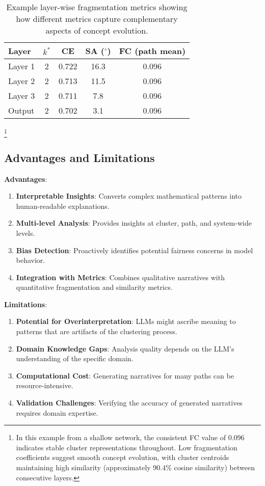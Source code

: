 \begin{table}[h!]
\centering
\caption{Example layer-wise fragmentation metrics showing how different metrics capture complementary aspects of concept evolution.}
\label{tab:fragmentation_metrics_example}
\begin{tabular}{lcccc}
\toprule
Layer & $k^*$ & CE & SA ($^\circ$) & FC (path mean) \\
\midrule
Layer 1 & 2 & 0.722 & 16.3 & 0.096 \\
Layer 2 & 2 & 0.713 & 11.5 & 0.096 \\
Layer 3 & 2 & 0.711 &  7.8 & 0.096 \\
Output  & 2 & 0.702 &  3.1 & 0.096 \\
\bottomrule
\end{tabular}
\end{table}\footnote{In this example from a shallow network, the consistent FC value of 0.096 indicates stable cluster representations throughout. Low fragmentation coefficients suggest smooth concept evolution, with cluster centroids maintaining high similarity (approximately 90.4\% cosine similarity) between consecutive layers.}

\subsection{Advantages and Limitations}

\textbf{Advantages}:
\begin{enumerate}
    \item \textbf{Interpretable Insights}: Converts complex mathematical patterns into human-readable explanations.
    \item \textbf{Multi-level Analysis}: Provides insights at cluster, path, and system-wide levels.
    \item \textbf{Bias Detection}: Proactively identifies potential fairness concerns in model behavior.
    \item \textbf{Integration with Metrics}: Combines qualitative narratives with quantitative fragmentation and similarity metrics.
\end{enumerate}

\textbf{Limitations}:
\begin{enumerate}
    \item \textbf{Potential for Overinterpretation}: LLMs might ascribe meaning to patterns that are artifacts of the clustering process.
    \item \textbf{Domain Knowledge Gaps}: Analysis quality depends on the LLM's understanding of the specific domain.
    \item \textbf{Computational Cost}: Generating narratives for many paths can be resource-intensive.
    \item \textbf{Validation Challenges}: Verifying the accuracy of generated narratives requires domain expertise.
\end{enumerate}

